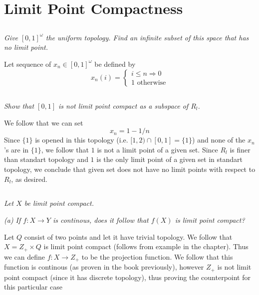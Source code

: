 \documentclass[11pt,oneside,titlepage]{book}
\DeclareMathOperator \ra {\Rightarrow}
\newcommand{\set}[1]{\{ #1 \}}
\begin{document}
\section{Limit Point Compactness}

\subsection{}

\textit{Give $[0, 1]^\omega$ the uniform topology. Find an infinite subset of this
  space that has no limit point.}

Let sequence of $x_n \in [0, 1]^\omega$ be defined by
$$x_n(i) =
\begin{cases}
  i \leq n \ra 0 \\
  1 \text{ otherwise}
\end{cases}
$$

\subsection{}

\textit{Show that $[0, 1]$ is not limit point compact as a subspace of $R_l$.}

We follow that we can set
$$x_n = 1 - 1/n$$
Since $\set{1}$ is opened in this topology (i.e. $[1, 2) \cap [0, 1] = \set{1}$) and
none of the $x_n$'s are in $\set{1}$, we follow that $1$ is not a limit point of a given
set. Since $R_l$ is finer than standart topology and $1$ is the only limit point of
a given set in standart topology, we conclude that given set does not have no limit points
with respect to $R_l$, as desired.

\subsection{}

\textit{Let $X$ be limit point compact.}

\textit{(a) If $f: X \to Y$ is continous, does it follow that $f(X)$ is limit point compact?}

Let $Q$ consist of two points and let it have trivial topology. We follow that
$X = Z_+ \times Q$ is limit point compact (follows from example in the chapter). Thus we can define
$f: X \to Z_+$ to be the projection function. We follow that this function is continous
(as proven in the book previously), however $Z_+$ is not limit point compact (since it
has discrete topology), thus proving the counterpoint for this particular case
\end{document}
